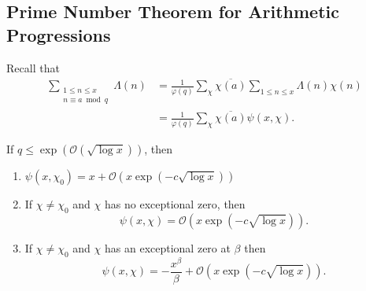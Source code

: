 \documentclass{article}
\newcommand{\1}{\mathbbm{1}}
\newcommand{\bigO}{\mathcal{O}}
\begin{document}
\subsection{Prime Number Theorem for Arithmetic Progressions}
Recall that
\begin{align*}
  \sum_{\substack{1 \leq n \leq x \\ n \equiv a \bmod{q}}} \Lambda(n) &= \frac{1}{\varphi(q)} \sum_\chi \overline{\chi(a)} \sum_{1 \leq n \leq x} \Lambda(n) \chi(n) \\
                                                           &= \frac{1}{\varphi(q)} \sum_\chi \overline{\chi(a)} \psi(x,\chi).
\end{align*}
\begin{thm}
  If $q \leq \exp(\bigO(\sqrt{\log x}))$, then
  \begin{enumerate}
    \item $\psi(x,\chi_0) = x + \bigO(x \exp(-c \sqrt{\log x}))$
    \item If $\chi \neq \chi_0$ and $\chi$ has no exceptional zero, then
      \begin{equation*}
        \psi(x,\chi) = \bigO(x \exp(-c \sqrt{\log x} ))
      .\end{equation*}
    \item If $\chi \neq \chi_0$ and $\chi$ has an exceptional zero at $\beta$ then
      \begin{equation*}
        \psi(x,\chi) = -\frac{x^\beta}{\beta} + \bigO(x \exp(-c\sqrt{\log x} ))
      .\end{equation*}
  \end{enumerate}
\end{thm}
\end{document}
